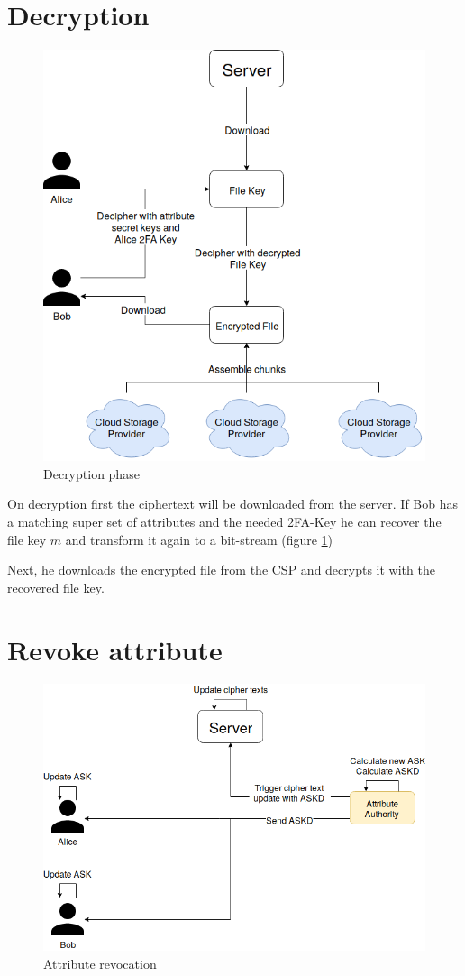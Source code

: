 \section{Decryption}
\begin{figure}[!t]
\centering
    \includegraphics[width=0.7\linewidth]{img/TF-DAC-MACS-overview-decrypt.png}
    \caption{Decryption phase}
    \label{fig:tfdacmacs-decryption}
\end{figure}

On decryption first the ciphertext will be downloaded from the server. If Bob has a matching super set of attributes and the needed 2FA-Key he can recover the file key $m$ and transform it again to a bit-stream (figure \ref{fig:tfdacmacs-decryption})

Next, he downloads the encrypted file from the CSP and decrypts it with the recovered file key.

\section{Revoke attribute}
\begin{figure}[!t]
\centering
    \includegraphics[width=0.7\linewidth]{img/TF-DAC-MACS-overview-revoce-attr.png}
    \caption{Attribute revocation}
    \label{fig:tfdacmacs-attr-revocation}
\end{figure}

